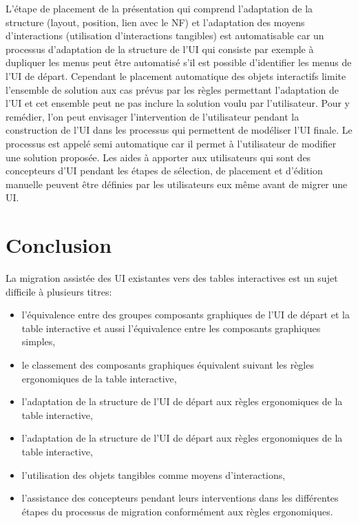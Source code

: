 L'étape de placement de la présentation qui comprend l'adaptation de la structure (layout, position, lien avec le NF) et l'adaptation des moyens d'interactions (utilisation d'interactions tangibles) est automatisable car un processus d'adaptation de la structure de l'UI  qui consiste par exemple à dupliquer les menus peut être automatisé s'il est possible d'identifier les menus de l'UI de départ. Cependant le placement automatique des objets interactifs limite l'ensemble de solution aux cas prévus par les règles permettant l'adaptation de l'UI et cet ensemble peut ne pas inclure la solution voulu par l'utilisateur. Pour y remédier, l'on peut envisager l'intervention de l'utilisateur pendant la construction de l'UI dans les processus qui permettent de modéliser l'UI finale. Le processus est appelé semi automatique car il permet à l'utilisateur de modifier une solution proposée. 
Les aides à apporter aux utilisateurs qui sont des concepteurs d'UI pendant les étapes de sélection, de placement et d'édition manuelle peuvent être définies par les utilisateurs eux même avant de migrer une UI.


{\raggedright
\section{Conclusion}
}

La migration assistée des UI existantes vers des tables interactives est un sujet difficile à plusieurs titres:

\begin{itemize}
	\item l'équivalence entre des groupes composants graphiques de l'UI de départ et la table interactive et aussi l'équivalence entre les composants graphiques simples,
	\item le classement des composants graphiques équivalent suivant les règles ergonomiques de la table interactive,
	\item l'adaptation de la structure de l'UI de d\'{e}part aux r\`{e}gles ergonomiques
de la table interactive,
	\item l'adaptation de la structure de l'UI de départ aux règles ergonomiques de la table interactive,
	\item l'utilisation des objets tangibles comme moyens d'interactions,
	\item l'assistance des concepteurs pendant leurs interventions dans les différentes étapes du processus de migration conformément aux règles ergonomiques.
\end{itemize}

